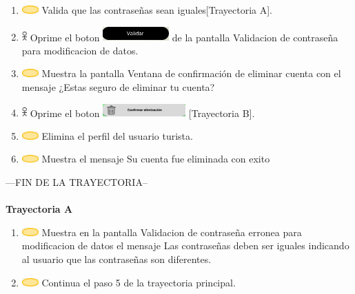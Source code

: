 \begin{enumerate}
        \item \includegraphics[width=0.0500\textwidth]{Figuras/sistema.png} Valida que las contraseñas sean iguales[Trayectoria A].
        \item \includegraphics[width=0.0150\textwidth]{Figuras/persona.png} Oprime el boton \includegraphics[width=0.2\textwidth]{ComponentesCU/img1.png} de la pantalla Validacion de contraseña para modificacion de datos.
        \item \includegraphics[width=0.0500\textwidth]{Figuras/sistema.png} Muestra la pantalla Ventana de confirmación de eliminar cuenta con el mensaje ¿Estas seguro de eliminar tu cuenta?
        \item \includegraphics[width=0.0150\textwidth]{Figuras/persona.png} Oprime el boton \includegraphics[width=0.25\textwidth]{ComponentesCU/img2.png} [Trayectoria B].
        \item \includegraphics[width=0.0500\textwidth]{Figuras/sistema.png} Elimina el perfil del usuario turista.
        \item \includegraphics[width=0.0500\textwidth]{Figuras/sistema.png} Muestra el mensaje Su cuenta fue eliminada con exito
    \end{enumerate}
---FIN DE LA TRAYECTORIA--\\\\
\textbf{Trayectoria A}
    \begin{enumerate}
        \item \includegraphics[width=0.0500\textwidth]{Figuras/sistema.png} Muestra en la pantalla Validacion de contraseña erronea para modificacion de datos el mensaje Las contraseñas deben ser iguales indicando al usuario que las contraseñas son diferentes.
        \item \includegraphics[width=0.0500\textwidth]{Figuras/sistema.png} Continua el paso 5 de la trayectoria principal.
    \end{enumerate}
